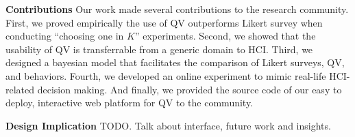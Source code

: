 \textbf{Contributions}
Our work made several contributions to the research community. 
First, we proved empirically 
the use of QV outperforms Likert survey
when conducting ``choosing one in $K$'' experiments.
Second, we showed that the usability of QV
is transferrable from a generic domain to HCI.
Third, we designed a bayesian model 
that facilitates the comparison
of Likert surveys, QV, and behaviors.
Fourth, we developed an online experiment
to mimic real-life HCI-related decision making.
And finally, we provided the source code of our easy to deploy, 
interactive web platform for QV to the community.

\textbf{Design Implication}
TODO. Talk about interface, future work and insights.
